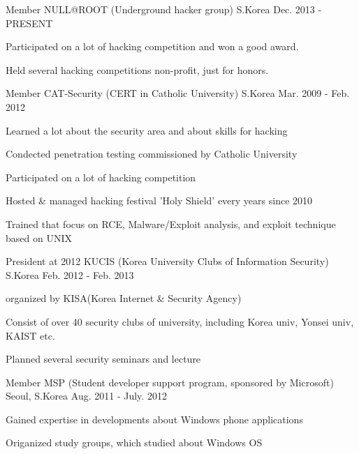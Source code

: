 \begin{cventries}
  \cventry
    {Member}
    {NULL@ROOT (Underground hacker group)}
    {S.Korea}
    {Dec. 2013 - PRESENT}
    {
      \begin{cvitems}
        \item {Participated on a lot of hacking competition and won a good award.}
        \item {Held several hacking competitions non-profit, just for honors.}
      \end{cvitems}
    }
  \cventry
    {Member}
    {CAT-Security (CERT in Catholic University)}
    {S.Korea}
    {Mar. 2009 - Feb. 2012}
    {
      \begin{cvitems}
        \item {Learned a lot about the security area and about skills for hacking}
        \item {Condected penetration testing commissioned by Catholic University}
        \item {Participated on a lot of hacking competition}
        \item {Hosted \& managed hacking festival 'Holy Shield' every years since 2010}
        \item {Trained that focus on RCE, Malware/Exploit analysis, and exploit technique based on UNIX}
      \end{cvitems}
    }
  \cventry
    {President at 2012}
    {KUCIS (Korea University Clubs of Information Security)}
    {S.Korea}
    {Feb. 2012 - Feb. 2013}
    {
      \begin{cvitems}
        \item {organized by KISA(Korea Internet \& Security Agency)}
        \item {Consist of over 40 security clubs of university, including Korea univ, Yonsei univ, KAIST etc.}
        \item {Planned several security seminars and lecture}
      \end{cvitems}
    }
  \cventry
    {Member}
    {MSP (Student developer support program, sponsored by Microsoft)}
    {Seoul, S.Korea}
    {Aug. 2011 - July. 2012}
    {
      \begin{cvitems}
        \item {Gained expertise in developments about Windows phone applications}
        \item {Origanized study groups, which studied about Windows OS}
      \end{cvitems}
    }
\end{cventries}
